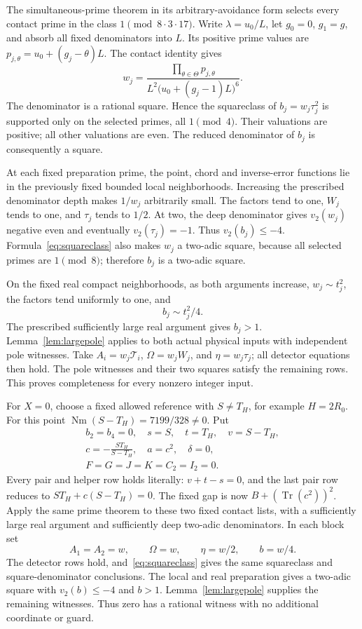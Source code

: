 \documentclass[11pt,a4paper]{article}
\DeclareMathOperator{\Tr}{Tr}\DeclareMathOperator{\Nm}{Nm}
\begin{document}
The simultaneous-prime theorem in its arbitrary-avoidance form
\cite{Primes} selects every contact prime in the class
$1\pmod{8\cdot3\cdot17}$. Write $\lambda=u_0/L$, let
$g_0=0$, $g_1=g$, and absorb all fixed denominators into $L$.
Its positive prime values are
$p_{j,\theta}=u_0+(g_j-\theta)L$. The contact identity gives
\begin{equation}\label{eq:squareclass}
 w_j=
 \frac{\prod_{\theta\in\Theta}p_{j,\theta}}
      {L^2\bigl(u_0+(g_j-1)L\bigr)^6}.
\end{equation}
The denominator is a rational square. Hence the squareclass of
$b_j=w_j\tau_j^2$ is supported only on the selected primes, all
$1\pmod4$. Their valuations are positive; all other valuations
are even. The reduced denominator of $b_j$ is consequently a square.

At each fixed preparation prime, the point, chord and inverse-error
functions lie in the previously fixed bounded local neighborhoods.
Increasing the prescribed denominator depth makes $1/w_j$
arbitrarily small. The factors tend to one, $W_j$ tends to one,
and $\tau_j$ tends to $1/2$. At two, the deep denominator gives
$v_2(w_j)$ negative even and eventually $v_2(\tau_j)=-1$.
Thus $v_2(b_j)\le-4$. Formula~\eqref{eq:squareclass} also makes
$w_j$ a two-adic square, because all selected primes are
$1\pmod8$; therefore $b_j$ is a two-adic square.

On the fixed real compact neighborhoods, as both arguments
increase, $w_j\sim t_j^2$, the factors tend uniformly to one, and
\[
                            b_j\sim t_j^2/4.
\]
The prescribed sufficiently large real argument gives $b_j>1$.
Lemma~\ref{lem:largepole} applies to both actual physical inputs
with independent pole witnesses. Take
$A_i=w_j\mathcal T_i$, $\Omega=w_jW_j$, and $\eta=w_j\tau_j$;
all detector equations then hold. The pole witnesses and their
two squares satisfy the remaining rows. This proves completeness
for every nonzero integer input.

For $X=0$, choose a fixed allowed reference with $S\ne T_H$,
for example $H=2R_0$. For this point
$\Nm(S-T_H)=7199/328\ne0$. Put
\begin{equation}\label{eq:zero}
\begin{gathered}
 b_2=b_4=0,\quad s=S,\quad t=T_H,\quad v=S-T_H,\\
 c=-\frac{ST_H}{S-T_H},\quad a=c^2,\quad\delta=0,\\
 F=G=J=K=C_2=I_2=0.
\end{gathered}
\end{equation}
Every pair and helper row holds literally: $v+t-s=0$, and the
last pair row reduces to $ST_H+c(S-T_H)=0$.
The fixed gap is now $B+(\Tr(c^2))^2$. Apply the same prime
theorem to these two fixed contact lists, with a sufficiently
large real argument and sufficiently deep two-adic denominators.
In each block set
\[
                A_1=A_2=w,\qquad\Omega=w,\qquad
                \eta=w/2,\qquad b=w/4.
\]
The detector rows hold, and~\eqref{eq:squareclass} gives the
same squareclass and square-denominator conclusions. The local
and real preparation gives a two-adic square with $v_2(b)\le-4$
and $b>1$. Lemma~\ref{lem:largepole} supplies the remaining
witnesses. Thus zero has a rational witness with no additional
coordinate or guard.
\end{document}
